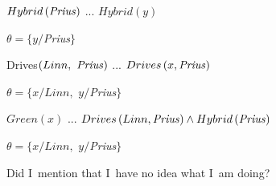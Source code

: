 \documentclass{article}
\begin{document}
$Hybrid\left( \text{\textit{Prius}}\right) $ ... $Hybrid\left( y\right) $

$\theta =\{y/$\textit{Prius}$\}$

Drives$\left( Linn,\text{ \textit{Prius}}\right) $ ... $Drives\left( x,\text{%
\textit{Prius}}\right) $

$\theta =\{x/Linn,$ $y/$\textit{Prius}$\}$

$Green\left( x\right) $ ... $Drives\left( Linn,\text{\textit{Prius}}\right)
\wedge Hybrid\left( \text{\textit{Prius}}\right) $

$\theta =\{x/Linn,$ $y/$\textit{Prius}$\}$

Did I\ mention that I\ have no idea what I\ am doing? 
\end{document}
